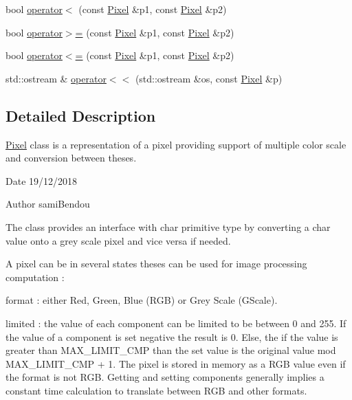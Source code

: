 \begin{DoxyCompactItemize}
\item 
bool \mbox{\hyperlink{class_pixel_a6cc03ea69b84151454e6cb42b066f3c6}{operator$<$}} (const \mbox{\hyperlink{class_pixel}{Pixel}} \&p1, const \mbox{\hyperlink{class_pixel}{Pixel}} \&p2)
\item 
bool \mbox{\hyperlink{class_pixel_a9564c5098775053d65c9f052b9281388}{operator$>$=}} (const \mbox{\hyperlink{class_pixel}{Pixel}} \&p1, const \mbox{\hyperlink{class_pixel}{Pixel}} \&p2)
\item 
bool \mbox{\hyperlink{class_pixel_a8e1356c4b2066282783d0c03526bd34f}{operator$<$=}} (const \mbox{\hyperlink{class_pixel}{Pixel}} \&p1, const \mbox{\hyperlink{class_pixel}{Pixel}} \&p2)
\item 
std\+::ostream \& \mbox{\hyperlink{class_pixel_af9850b2e5c78fc7f7e841c490713168e}{operator$<$$<$}} (std\+::ostream \&os, const \mbox{\hyperlink{class_pixel}{Pixel}} \&p)
\end{DoxyCompactItemize}


\subsection{Detailed Description}
\mbox{\hyperlink{class_pixel}{Pixel}} class is a representation of a pixel providing support of multiple color scale and conversion between theses. 

\begin{DoxyDate}{Date}
19/12/2018 
\end{DoxyDate}
\begin{DoxyAuthor}{Author}
sami\+Bendou
\end{DoxyAuthor}
The class provides an interface with char primitive type by converting a char value onto a grey scale pixel and vice versa if needed.

A pixel can be in several states theses can be used for image processing computation \+:
\begin{DoxyItemize}
\item format \+: either Red, Green, Blue (R\+GB) or Grey Scale (G\+Scale).
\item limited \+: the value of each component can be limited to be between 0 and 255. If the value of a component is set negative the result is 0. Else, the if the value is greater than M\+A\+X\+\_\+\+L\+I\+M\+I\+T\+\_\+\+C\+MP than the set value is the original value mod M\+A\+X\+\_\+\+L\+I\+M\+I\+T\+\_\+\+C\+MP + 1. The pixel is stored in memory as a R\+GB value even if the format is not R\+GB. Getting and setting components generally implies a constant time calculation to translate between R\+GB and other formats. 
\end{DoxyItemize}

